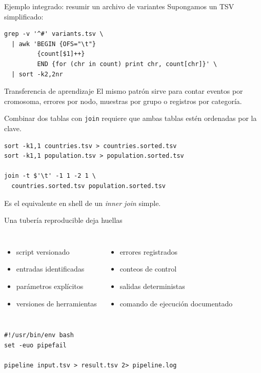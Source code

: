 \documentclass[aspectratio=169,11pt]{beamer}
\begin{document}
\begin{frame}[fragile]{Ejemplo integrado: resumir un archivo de variantes}
  \small Supongamos un TSV simplificado: 
\begin{lstlisting}
grep -v '^#' variants.tsv \
  | awk 'BEGIN {OFS="\t"}
         {count[$1]++}
         END {for (chr in count) print chr, count[chr]}' \
  | sort -k2,2nr
\end{lstlisting}
  \vspace{4mm}
  \begin{wideblock}{Transferencia de aprendizaje}
    El mismo patrón sirve para contar eventos por cromosoma, errores por nodo, muestras por grupo o registros por categoría.
  \end{wideblock}
\end{frame}

\begin{frame}[fragile]{Combinar dos tablas con \texttt{join}}
  \small {} requiere que ambas tablas estén ordenadas por la clave.
\begin{lstlisting}
sort -k1,1 countries.tsv > countries.sorted.tsv
sort -k1,1 population.tsv > population.sorted.tsv

join -t $'\t' -1 1 -2 1 \
  countries.sorted.tsv population.sorted.tsv
\end{lstlisting}
  \vspace{4mm}
  \pill[Amber]{Concepto}\quad Es el equivalente en shell de un \emph{inner join} simple.
\end{frame}

\begin{frame}[fragile]{Una tubería reproducible deja huellas}
  \begin{columns}[T,onlytextwidth]
      \begin{itemize}[<+->]
        \item script versionado
        \item entradas identificadas
        \item parámetros explícitos
        \item versiones de herramientas
      \end{itemize}
    \column{.48\textwidth}
      \begin{itemize}[<+->]
        \item errores registrados
        \item conteos de control
        \item salidas deterministas
        \item comando de ejecución documentado
      \end{itemize}
  \end{columns}
  \vspace{5mm}
\begin{lstlisting}
#!/usr/bin/env bash
set -euo pipefail

pipeline input.tsv > result.tsv 2> pipeline.log
\end{lstlisting}
\end{frame}
\end{document}
